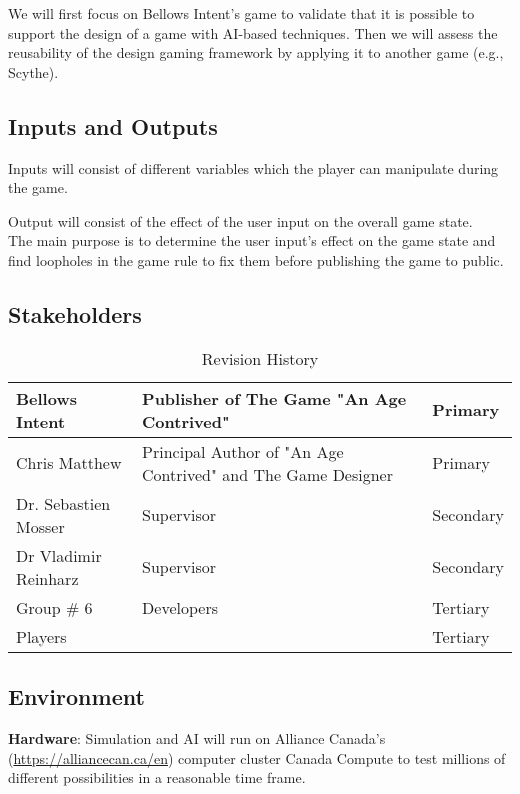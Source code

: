 \documentclass{article}
\begin{document}
We will first focus on Bellows Intent's game to validate that it is
possible to support the design of a game with AI-based techniques. Then we will
assess the reusability of the design gaming framework by applying it to another
game (e.g., Scythe).

\subsection{Inputs and Outputs}

Inputs will consist of different variables which the player can manipulate during the game.

Output will consist of the effect of the user input on the overall game state.\\ 
The main purpose is to determine the user input's effect on the game state and find loopholes in the game rule to fix them before publishing the game to public.

\subsection{Stakeholders}
\begin{table}[hp]
\caption{Revision History} \label{TblRevisionHistory}
\begin{tabularx}{\textwidth}{p{5cm}p{5cm}p{1.5cm}}
\toprule
Bellows Intent & Publisher of The Game "An Age Contrived" & Primary\\
\midrule
Chris Matthew & Principal Author of "An Age Contrived" and The Game Designer & Primary\\
\midrule
Dr. Sebastien Mosser & Supervisor & Secondary\\
\midrule
Dr Vladimir Reinharz & Supervisor & Secondary\\
\midrule
Group \# 6 & Developers & Tertiary\\
\midrule
Players & & Tertiary\\
\bottomrule
\end{tabularx}
\end{table}

\noindent 


\subsection{Environment}

\textbf{Hardware}: Simulation and AI will run on Alliance Canada's (\url{https://alliancecan.ca/en}) computer cluster Canada Compute  to test millions of different possibilities in a reasonable time frame.
\end{document}
